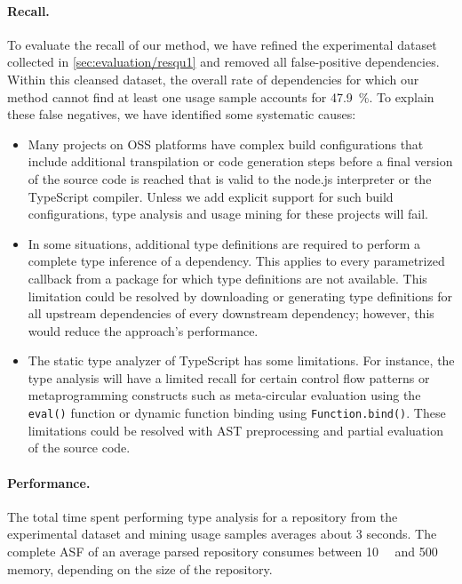 \documentclass[a4paper,twoside]{article}
\begin{document}
\paragraph{Recall.}
To evaluate the recall of our method, we have refined the experimental dataset collected in \cref{sec:evaluation/resqu1} and removed all false-positive dependencies.
Within this cleansed dataset, the overall rate of dependencies for which our method cannot find at least one usage sample accounts for \SI{47.9}{\percent}.
To explain these false negatives, we have identified some systematic causes:
\begin{itemize}
	\item Many projects on OSS platforms have complex build configurations that include additional transpilation or code generation steps before a final version of the source code is reached that is valid to the node.js interpreter or the TypeScript compiler.
		Unless we add explicit support for such build configurations, type analysis and usage mining for these projects will fail.
	\item In some situations, additional type definitions are required to perform a complete type inference of a dependency.
		This applies to every parametrized callback from a package for which type definitions are not available.
		This limitation could be resolved by downloading or generating type definitions for all upstream dependencies of every downstream dependency; however, this would reduce the approach's performance.
	\item The static type analyzer of TypeScript has some limitations.
		For instance, the type analysis will have a limited recall for certain control flow patterns or metaprogramming constructs such as meta-circular evaluation using the \texttt{eval()} function or dynamic function binding using \texttt{Function.bind()}.
		These limitations could be resolved with AST preprocessing and partial evaluation of the source code.
\end{itemize}

\paragraph{Performance.}
The total time spent performing type analysis for a repository from the experimental dataset and mining usage samples averages about \num{3} seconds.
The complete ASF of an average parsed repository consumes between \SI{10}{\mega\byte} and \SI{500}{\mega\byte} memory, depending on the size of the repository.
\end{document}
